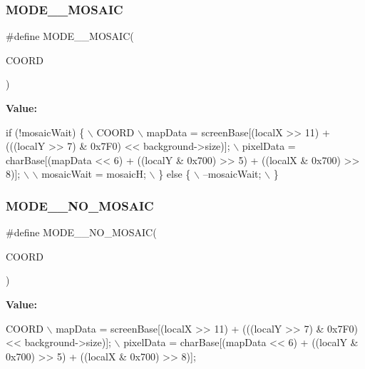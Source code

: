 \subsubsection{\texorpdfstring{M\+O\+D\+E\+\_\+\_\+\+M\+O\+S\+A\+IC}{MODE\_2\_MOSAIC}}
{\footnotesize\ttfamily \#define M\+O\+D\+E\+\_\+\_\+\+M\+O\+S\+A\+IC(\begin{DoxyParamCaption}\item[{}]{C\+O\+O\+RD }\end{DoxyParamCaption})}

{\bfseries Value\+:}
\begin{DoxyCode}
\textcolor{keywordflow}{if} (!mosaicWait) \{ \(\backslash\)
            COORD \(\backslash\)
            mapData = screenBase[(localX >> 11) + (((localY >> 7) & 0x7F0) << background->size)]; \(\backslash\)
            pixelData = charBase[(mapData << 6) + ((localY & 0x700) >> 5) + ((localX & 0x700) >> 8)]; \(\backslash\)
            \(\backslash\)
            mosaicWait = mosaicH; \(\backslash\)
        \} \textcolor{keywordflow}{else} \{ \(\backslash\)
            --mosaicWait; \(\backslash\)
        \}
\end{DoxyCode}
\mbox{\label{software-bg_8c_a523cbe774cf992170ce1867f40de6981}} 
\subsubsection{\texorpdfstring{M\+O\+D\+E\+\_\+\_\+\+N\+O\+\_\+\+M\+O\+S\+A\+IC}{MODE\_2\_NO\_MOSAIC}}
{\footnotesize\ttfamily \#define M\+O\+D\+E\+\_\+\_\+\+N\+O\+\_\+\+M\+O\+S\+A\+IC(\begin{DoxyParamCaption}\item[{}]{C\+O\+O\+RD }\end{DoxyParamCaption})}

{\bfseries Value\+:}
\begin{DoxyCode}
COORD \(\backslash\)
    mapData = screenBase[(localX >> 11) + (((localY >> 7) & 0x7F0) << background->size)]; \(\backslash\)
    pixelData = charBase[(mapData << 6) + ((localY & 0x700) >> 5) + ((localX & 0x700) >> 8)];
\end{DoxyCode}


